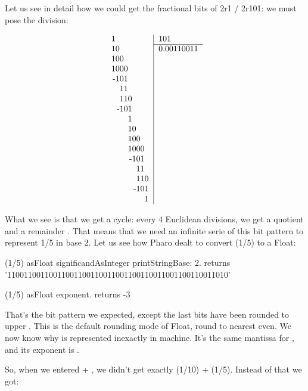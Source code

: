 \documentclass[a4paper,10pt,twoside]{book}
\begin{document}
Let us see in detail how we could get the fractional bits of 2r1 / 2r101: we must pose the division:

\[
\begin{tabular}{r|l}
\multicolumn{1}{r|}{1\phantom{00000000}} & 101 \\  \cline{2-2}
10\phantom{0000000} & 0.00110011 \\ 
100\phantom{000000}  & \\
1000\phantom{00000}  & \\
-101\phantom{00000}  & \\
   11\phantom{00000}  & \\
   110\phantom{0000} & \\
  -101\phantom{0000} & \\
        1\phantom{0000} & \\
        10\phantom{000} & \\
        100\phantom{00} & \\
        1000\phantom{0} & \\
         -101\phantom{0} & \\
             11\phantom{0} & \\
             110 & \\
            -101 & \\
                  1 & \\
\end{tabular} 
 \]

What we see is that we get a cycle: every 4 Euclidean divisions, we get a quotient  and a remainder . That means that we need an infinite serie of this bit pattern  to represent 1/5 in base 2. Let us see how Pharo dealt to convert (1/5) to a Float:

 \begin{code}{}
(1/5) asFloat significandAsInteger printStringBase: 2.
	returns '11001100110011001100110011001100110011001100110011010'
	
(1/5) asFloat exponent.
	returns -3
\end{code}

That's the bit pattern we expected, except the last bits  have been rounded to upper . This is the default rounding mode of Float, round to nearest even. We now know why  is represented inexactly in machine. It's the same mantissa for , and its exponent is .

So, when we entered  + , we didn't get exactly (1/10) + (1/5).
Instead of that we got:
\end{document}
